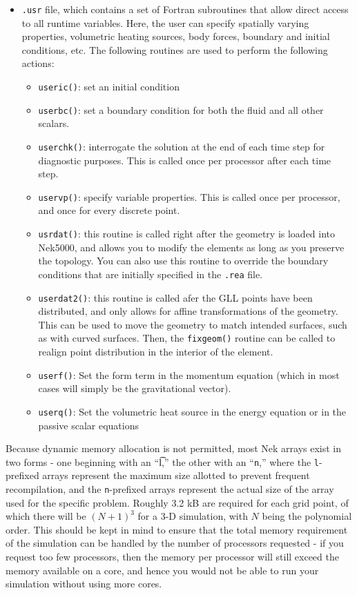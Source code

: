 \documentclass[10pt]{article}
\numberwithin{equation}{section} %
\begin{document}
\begin{itemize}
\item {\tt .usr} file, which contains a set of Fortran subroutines that allow direct access to all runtime variables. Here, the user can specify spatially varying properties, volumetric heating sources, body forces, boundary and initial conditions, etc. The following routines are used to perform the following actions:
	\begin{itemize}
	\item {\tt useric()}: set an initial condition
	\item {\tt userbc()}: set a boundary condition for both the fluid and all other scalars. 
	\item {\tt userchk()}: interrogate the solution at the end of each time step for diagnostic purposes. This is called once per processor after each time step.
	\item {\tt uservp()}: specify variable properties. This is called once per processor, and once for every discrete point.
	\item {\tt usrdat()}: this routine is called right after the geometry is loaded into Nek5000, and allows you to modify the elements as long as you preserve the topology. You can also use this routine to override the boundary conditions that are initially specified in the {\tt .rea} file. 
	\item {\tt userdat2()}: this routine is called afer the GLL points have been distributed, and only allows for affine transformations of the geometry. This can be used to move the geometry to match intended surfaces, such as with curved surfaces. Then, the {\tt fixgeom()} routine can be called to realign point distribution in the interior of the element.
	\item {\tt userf()}: Set the form term in the momentum equation (which in most cases will simply be the gravitational vector). 
	\item {\tt userq()}: Set the volumetric heat source in the energy equation or in the passive scalar equations
	\end{itemize}
\end{itemize}

Because dynamic memory allocation is not permitted, most Nek arrays exist in two forms - one beginning with an ``{\t l},'' the other with an ``{\tt n},'' where the {\tt l}-prefixed arrays represent the maximum size allotted to prevent frequent recompilation, and the {\tt n}-prefixed arrays represent the actual size of the array used for the specific problem. Roughly 3.2 kB are required for each grid point, of which there will be \((N+1)^3\) for a 3-D simulation, with \(N\) being the polynomial order. This should be kept in mind to ensure that the total memory requirement of the simulation can be handled by the number of processors requested - if you request too few processors, then the memory per processor will still exceed the memory available on a core, and hence you would not be able to run your simulation without using more cores.
\end{document}

